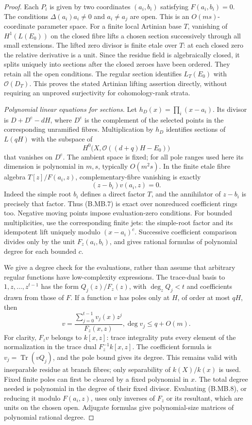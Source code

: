 \begin{proof}
Each $P_i$ is given by two coordinates $(a_i,b_i)$ satisfying
$F(a_i,b_i)=0$. The conditions
$\Delta(a_i)a_i\ne0$ and $a_i\ne a_j$ are open. This is an
$O(ms)$-coordinate parameter space. For a finite local Artinian
base $T$, vanishing of $H^1(L(E_0))$ on the closed fibre lifts
a chosen section successively through all small extensions.
The lifted zero divisor is finite etale over $T$: at each
closed zero the relative derivative is a unit. Since the
residue field is algebraically closed, it splits uniquely
into sections after the closed zeroes have been ordered.
They retain all the open conditions. The regular section
identifies $L_T(E_0)$ with $\mathcal O(D_T)$. This proves the
stated Artinian lifting assertion directly, without requiring
an unproved surjectivity for cohomology-rank strata.

\emph{Polynomial linear equations for sections.}
Let $h_D(x)=\prod_i(x-a_i)$. Its divisor is
$D+D^{\mathrm c}-dH$, where $D^{\mathrm c}$ is the complement
of the selected points in the corresponding unramified fibres.
Multiplication by $h_D$ identifies sections of $L(qH)$ with
the subspace of
\[
 H^0\bigl(X,\mathcal O((d+q)H-E_0)\bigr)                 \tag{B.MB.6}
\]
that vanishes on $D^{\mathrm c}$. The ambient space is fixed;
for all pole ranges used here its dimension is polynomial
in $m,s$, typically $O(m^2s)$. In the finite etale fibre algebra
$T[z]/F(a_i,z)$, complementary-fibre vanishing is exactly
\[
                  (z-b_i)v(a_i,z)=0.                     \tag{B.MB.7}
\]
Indeed the simple root $b_i$ defines a direct factor $T$,
and the annihilator of $z-b_i$ is precisely that factor.
Thus (B.MB.7) is exact over nonreduced coefficient rings too.
Negative moving points impose evaluation-zero conditions.
For bounded multiplicities, use the corresponding finite
jets: the simple-root factor and its idempotent lift uniquely
modulo $(x-a_i)^c$. Successive coefficient comparison divides
only by the unit $F_z(a_i,b_i)$, and gives rational formulas
of polynomial degree for each bounded $c$.

We give a degree check for the evaluations, rather than assume
that arbitrary regular functions have low-complexity expressions.
The trace-dual basis to $1,z,\ldots,z^{t-1}$ has the form
$Q_j(z)/F_z(z)$, with $\deg_zQ_j<t$ and coefficients drawn
from those of $F$. If a function $v$ has poles only at $H$,
of order at most $qH$, then
\[
 v=\frac{\sum_{j=0}^{t-1}v_j(x)z^j}{F_z(x,z)},
                  \deg v_j\leq q+O(m).                  \tag{B.MB.8}
\]
For clarity, $F_zv$ belongs to $k[x,z]$: trace integrality
puts every element of the normalization in the trace dual
$F_z^{-1}k[x,z]$. The coefficient formula is
$v_j=\operatorname{Tr}(vQ_j)$, and the pole bound gives its
degree. This remains valid with inseparable residue at branch
fibres; only separability of $k(X)/k(x)$ is used.
Fixed finite poles can first be cleared by a fixed polynomial
in $x$. The total degree needed is polynomial in the degree
of their fixed divisor. Evaluating (B.MB.8), or reducing it
modulo $F(a_i,z)$, uses only inverses of $F_z$ or its resultant,
which are units on the chosen open. Adjugate formulas give
polynomial-size matrices of polynomial rational degree.


\end{proof}
